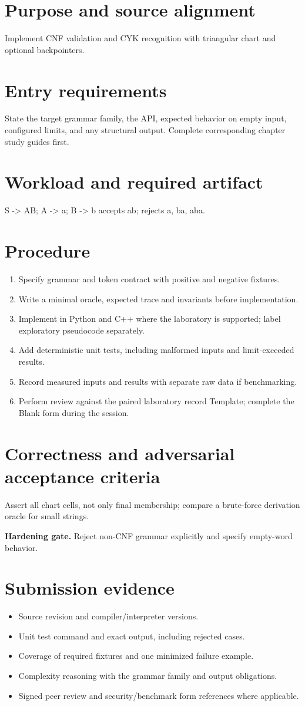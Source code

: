 \documentclass[11pt,letterpaper]{article}
\begin{document}
\makedoctitle\makedocsummary
\tableofcontents\clearpage
\section{Purpose and source alignment}
Implement CNF validation and CYK recognition with triangular chart and optional backpointers.
\section{Entry requirements}
State the target grammar family, the API, expected behavior on empty input, configured limits, and any structural output. Complete corresponding chapter study guides first.
\section{Workload and required artifact}
S -> AB; A -> a; B -> b accepts ab; rejects a, ba, aba.
\section{Procedure}
\begin{enumerate}\item Specify grammar and token contract with positive and negative fixtures.\item Write a minimal oracle, expected trace and invariants before implementation.\item Implement in Python and C++ where the laboratory is supported; label exploratory pseudocode separately.\item Add deterministic unit tests, including malformed inputs and limit-exceeded results.\item Record measured inputs and results with separate raw data if benchmarking.\item Perform review against the paired laboratory record Template; complete the Blank form during the session.\end{enumerate}
\section{Correctness and adversarial acceptance criteria}
Assert all chart cells, not only final membership; compare a brute-force derivation oracle for small strings.\par\textbf{Hardening gate.} Reject non-CNF grammar explicitly and specify empty-word behavior.
\section{Submission evidence}
\begin{itemize}\item Source revision and compiler/interpreter versions.\item Unit test command and exact output, including rejected cases.\item Coverage of required fixtures and one minimized failure example.\item Complexity reasoning with the grammar family and output obligations.\item Signed peer review and security/benchmark form references where applicable.\end{itemize}
\end{document}
